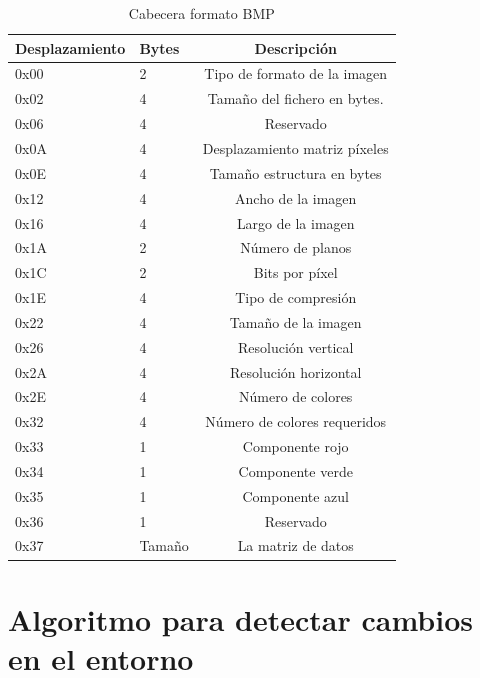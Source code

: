 \begin{table}[htpb]
\centering
	\begin{tabular}{|p{}|p{}|c|}
	\hline
	\rowcolor[HTML]{9B9B9B}
	{Desplazamiento}\centering & {Bytes}\centering & {Descripción} \\
	\hline
	0x00\centering & 2\centering & Tipo de formato de la imagen\\\hline
	0x02\centering & 4\centering & Tamaño del fichero en bytes.\\\hline
	0x06\centering & 4\centering & Reservado\\\hline
	0x0A\centering & 4\centering & Desplazamiento matriz píxeles\\\hline
	0x0E\centering & 4\centering & Tamaño estructura en bytes\\\hline
	0x12\centering & 4\centering & Ancho de la imagen\\\hline
	0x16\centering & 4\centering & Largo de la imagen\\\hline
	0x1A\centering & 2\centering & Número de planos\\\hline
	0x1C\centering & 2\centering & Bits por píxel\\\hline
	0x1E\centering & 4\centering & Tipo de compresión\\\hline
	0x22\centering & 4\centering & Tamaño de la imagen\\\hline
	0x26\centering & 4\centering & Resolución vertical\\\hline
	0x2A\centering & 4\centering & Resolución horizontal\\\hline
	0x2E\centering & 4\centering & Número de colores\\\hline
	0x32\centering & 4\centering & Número de colores requeridos\\\hline
	0x33\centering & 1\centering & Componente rojo\\\hline
	0x34\centering & 1\centering & Componente verde\\\hline
	0x35\centering & 1\centering & Componente azul\\\hline
	0x36\centering & 1\centering & Reservado \\\hline
	0x37\centering & Tamaño\centering & La matriz de datos\\\hline
	\end{tabular}
	\caption{Cabecera formato BMP}
	\label{tab:Cabecera24}
\end{table}

\section{Algoritmo para detectar cambios en el entorno}\label{sec:RestaImagenes} 

